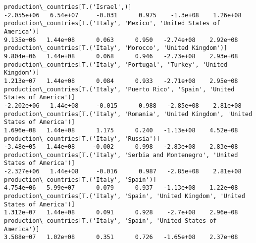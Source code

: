 \documentclass[11pt]{article}
\begin{document}
\begin{Verbatim}[commandchars=\\\{\}]
production\_countries[T.('Israel',)]                                                                                                                                                   -2.055e+06   6.54e+07     -0.031      0.975    -1.3e+08    1.26e+08
production\_countries[T.('Italy', 'Mexico', 'United States of America')]                                                                                                                9.135e+06   1.44e+08      0.063      0.950   -2.74e+08    2.92e+08
production\_countries[T.('Italy', 'Morocco', 'United Kingdom')]                                                                                                                         9.804e+06   1.44e+08      0.068      0.946   -2.73e+08    2.93e+08
production\_countries[T.('Italy', 'Portugal', 'Turkey', 'United Kingdom')]                                                                                                              1.213e+07   1.44e+08      0.084      0.933   -2.71e+08    2.95e+08
production\_countries[T.('Italy', 'Puerto Rico', 'Spain', 'United States of America')]                                                                                                 -2.202e+06   1.44e+08     -0.015      0.988   -2.85e+08    2.81e+08
production\_countries[T.('Italy', 'Romania', 'United Kingdom', 'United States of America')]                                                                                             1.696e+08   1.44e+08      1.175      0.240   -1.13e+08    4.52e+08
production\_countries[T.('Italy', 'Russia')]                                                                                                                                            -3.48e+05   1.44e+08     -0.002      0.998   -2.83e+08    2.83e+08
production\_countries[T.('Italy', 'Serbia and Montenegro', 'United States of America')]                                                                                                -2.327e+06   1.44e+08     -0.016      0.987   -2.85e+08    2.81e+08
production\_countries[T.('Italy', 'Spain')]                                                                                                                                             4.754e+06   5.99e+07      0.079      0.937   -1.13e+08    1.22e+08
production\_countries[T.('Italy', 'Spain', 'United Kingdom', 'United States of America')]                                                                                               1.312e+07   1.44e+08      0.091      0.928    -2.7e+08    2.96e+08
production\_countries[T.('Italy', 'Spain', 'United States of America')]                                                                                                                 3.588e+07   1.02e+08      0.351      0.726   -1.65e+08    2.37e+08

\end{Verbatim}
\end{document}
